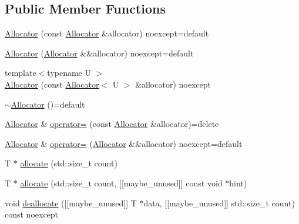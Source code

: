 \subsection*{Public Member Functions}
\begin{DoxyCompactItemize}
\item 
\mbox{\hyperlink{classmage_1_1_memory_arena_1_1_allocator_a2e2645fcc2598ff377c88859ba153606}{Allocator}} (const \mbox{\hyperlink{classmage_1_1_memory_arena_1_1_allocator}{Allocator}} \&allocator) noexcept=default
\item 
\mbox{\hyperlink{classmage_1_1_memory_arena_1_1_allocator_a153cec9d65f697b3e8631c866b2abe96}{Allocator}} (\mbox{\hyperlink{classmage_1_1_memory_arena_1_1_allocator}{Allocator}} \&\&allocator) noexcept=default
\item 
{\footnotesize template$<$typename U $>$ }\\\mbox{\hyperlink{classmage_1_1_memory_arena_1_1_allocator_a412318dd063697fc4a2238c131b5e0e9}{Allocator}} (const \mbox{\hyperlink{classmage_1_1_memory_arena_1_1_allocator}{Allocator}}$<$ U $>$ \&allocator) noexcept
\item 
\mbox{\hyperlink{classmage_1_1_memory_arena_1_1_allocator_afbac57b961cea93932dff48c0a104c50}{$\sim$\+Allocator}} ()=default
\item 
\mbox{\hyperlink{classmage_1_1_memory_arena_1_1_allocator}{Allocator}} \& \mbox{\hyperlink{classmage_1_1_memory_arena_1_1_allocator_aca3a631f0323c15f27dfc7ce42763be0}{operator=}} (const \mbox{\hyperlink{classmage_1_1_memory_arena_1_1_allocator}{Allocator}} \&allocator)=delete
\item 
\mbox{\hyperlink{classmage_1_1_memory_arena_1_1_allocator}{Allocator}} \& \mbox{\hyperlink{classmage_1_1_memory_arena_1_1_allocator_a4d9c913c8eff35781d507875f6f83934}{operator=}} (\mbox{\hyperlink{classmage_1_1_memory_arena_1_1_allocator}{Allocator}} \&\&allocator) noexcept=default
\item 
T $\ast$ \mbox{\hyperlink{classmage_1_1_memory_arena_1_1_allocator_a8a8a92fc0732eb1ad8ae4b1e5ec6cb58}{allocate}} (std\+::size\+\_\+t count)
\item 
T $\ast$ \mbox{\hyperlink{classmage_1_1_memory_arena_1_1_allocator_accba4687fb1bd523de4cb3e07b3f068e}{allocate}} (std\+::size\+\_\+t count, \mbox{[}\mbox{[}maybe\+\_\+unused\mbox{]}\mbox{]} const void $\ast$hint)
\item 
void \mbox{\hyperlink{classmage_1_1_memory_arena_1_1_allocator_a012cd52c73b5dece517f31caf4b039e3}{deallocate}} (\mbox{[}\mbox{[}maybe\+\_\+unused\mbox{]}\mbox{]} T $\ast$data, \mbox{[}\mbox{[}maybe\+\_\+unused\mbox{]}\mbox{]} std\+::size\+\_\+t count) const noexcept

\end{DoxyCompactItemize}

